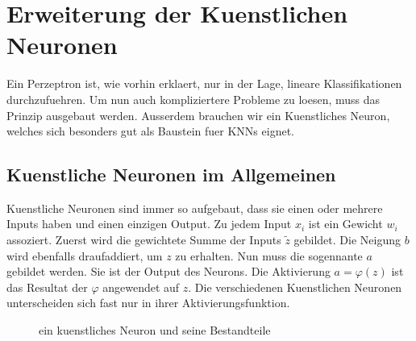 \section{Erweiterung der Kuenstlichen Neuronen}\label{sec:kuenstlicheNeuronen}
Ein Perzeptron ist, wie vorhin erklaert, nur in der Lage, lineare Klassifikationen
durchzufuehren. Um nun auch kompliziertere Probleme zu loesen, muss das Prinzip
ausgebaut werden. Ausserdem brauchen wir ein Kuenstliches Neuron, welches sich
besonders gut als Baustein fuer KNNs eignet.

\subsection{Kuenstliche Neuronen im Allgemeinen}
Kuenstliche Neuronen sind immer so aufgebaut, dass sie einen oder mehrere Inputs
haben und einen einzigen Output. Zu jedem Input $x_i$ ist ein Gewicht
$w_{i}$ assoziert. Zuerst wird die gewichtete Summe der Inputs $\tilde{z}$ gebildet.
Die Neigung $b$ wird ebenfalls draufaddiert, um $z$ zu erhalten. Nun muss
die sogennante  $a$ gebildet werden. Sie ist der Output des Neurons.
Die Aktivierung $a = \varphi(z)$ ist das Resultat der  $\varphi$ angewendet
auf $z$. Die verschiedenen Kuenstlichen Neuronen unterscheiden
sich fast nur in ihrer Aktivierungsfunktion.
\\
\begin{figure}[h!]

  \caption{ein kuenstliches Neuron und seine Bestandteile}
\end{figure}
\\

